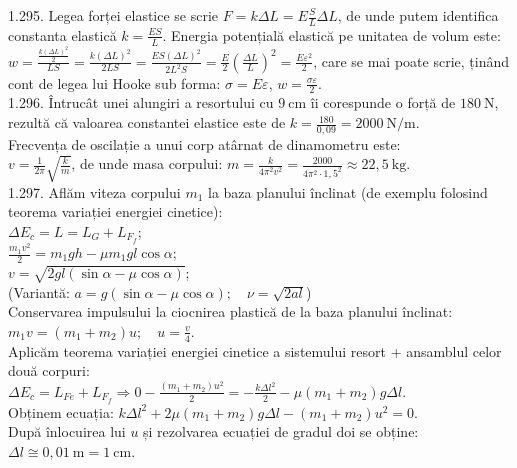 1.295. Legea forței elastice se scrie $F=k \Delta L=E \frac{S}{L} \Delta L$, de unde putem identifica constanta elastică $k=\frac{E S}{L}$. Energia potențială elastică pe unitatea de volum este:\\ $w=\frac{\frac{k(\Delta L)^{2}}{2}}{L S}=\frac{k(\Delta L)^{2}}{2 L S}=\frac{E S(\Delta L)^{2}}{2 L^{2} S}=\frac{E}{2}\left(\frac{\Delta L}{L}\right)^{2}=\frac{E \varepsilon^{2}}{2}$, care se mai poate scrie, ținând cont de legea lui Hooke sub forma: $\sigma=E \varepsilon$, $w=\frac{\sigma \varepsilon}{2}$.\\

1.296. Întrucât unei alungiri a resortului cu $9 \mathrm{~cm}$ îi corespunde o forță de $180 \mathrm{~N}$, rezultă că valoarea constantei elastice este de $k=\frac{180}{0,09}=2000 \mathrm{~N} / \mathrm{m}$.\\ Frecvența de oscilație a unui corp atârnat de dinamometru este:\\ $v=\frac{1}{2 \pi} \sqrt{\frac{k}{m}}$, de unde masa corpului: $m=\frac{k}{4 \pi^{2} v^{2}}=\frac{2000}{4 \pi^{2} \cdot 1,5^{2}} \approx 22,5 \mathrm{~kg}$.\\

1.297. Aflăm viteza corpului $m_{1}$ la baza planului înclinat (de exemplu folosind teorema variației energiei cinetice):\\ $\Delta E_{c}=L=L_{G}+L_{F_{f}}$;\\ $\frac{m_{1} v^{2}}{2}=m_{1} g h-\mu m_{1} g l \cos \alpha$;\\ $v=\sqrt{2 g l(\sin \alpha-\mu \cos \alpha)}$;\\ (Variantă: $a=g(\sin \alpha-\mu \cos \alpha) ; \quad \nu=\sqrt{2 a l}$)\\ Conservarea impulsului la ciocnirea plastică de la baza planului înclinat:\\ $m_{1} v=\left(m_{1}+m_{2}\right) u; \quad u=\frac{v}{4}$.\\ Aplicăm teorema variației energiei cinetice a sistemului resort + ansamblul celor două corpuri:\\ $\Delta E_{c}=L_{F e}+L_{F_{f}} \Rightarrow 0-\frac{\left(m_{1}+m_{2}\right) u^{2}}{2}=-\frac{k \Delta l^{2}}{2}-\mu\left(m_{1}+m_{2}\right) g \Delta l$.\\ Obținem ecuația: $k \Delta l^{2}+2 \mu\left(m_{1}+m_{2}\right) g \Delta l-\left(m_{1}+m_{2}\right) u^{2}=0$.\\ După înlocuirea lui $u$ și rezolvarea ecuației de gradul doi se obține:\\ $\Delta l \cong 0,01 \mathrm{~m}=1 \mathrm{~cm}$.\\

